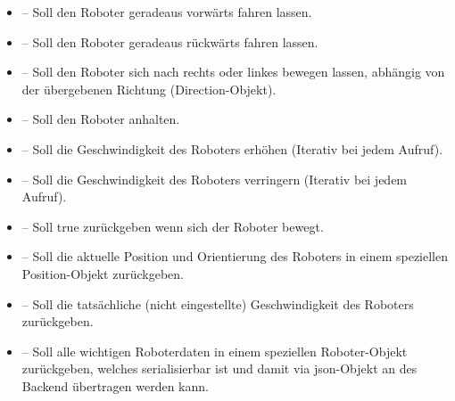 \begin{itemize}
	\item{} -- Soll den Roboter geradeaus vorwärts fahren lassen.
	\item{} -- Soll den Roboter geradeaus rückwärts fahren lassen.
	\item{} -- Soll den Roboter sich nach rechts oder linkes bewegen lassen, abhängig von der übergebenen Richtung
	(Direction-Objekt).
	\item{} -- Soll den Roboter anhalten.
	\item{} -- Soll die Geschwindigkeit des Roboters erhöhen (Iterativ bei jedem Aufruf).
	\item{} -- Soll die Geschwindigkeit des Roboters verringern (Iterativ bei jedem Aufruf).
	\item{} -- Soll true zurückgeben wenn sich der Roboter bewegt.
	\item{} -- Soll die aktuelle Position und Orientierung des Roboters in einem speziellen 
	Position-Objekt zurückgeben.
	\item{} -- Soll die tatsächliche (nicht eingestellte) Geschwindigkeit des Roboters zurückgeben.
	\item{} -- Soll alle wichtigen Roboterdaten in einem speziellen Roboter-Objekt zurückgeben, welches 
	serialisierbar ist und damit via \gls{json}-Objekt an des Backend übertragen werden kann.
\end{itemize}
